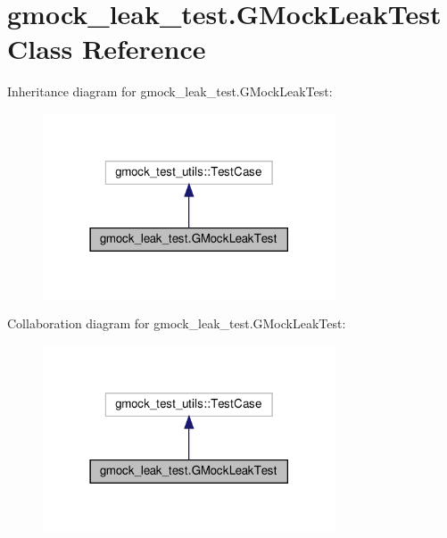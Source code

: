 \hypertarget{classgmock__leak__test_1_1_g_mock_leak_test}{}\section{gmock\+\_\+leak\+\_\+test.\+G\+Mock\+Leak\+Test Class Reference}
\label{classgmock__leak__test_1_1_g_mock_leak_test}


Inheritance diagram for gmock\+\_\+leak\+\_\+test.\+G\+Mock\+Leak\+Test\+:
\nopagebreak
\begin{figure}[H]
\begin{center}
\leavevmode
\includegraphics[width=246pt]{classgmock__leak__test_1_1_g_mock_leak_test__inherit__graph}
\end{center}
\end{figure}


Collaboration diagram for gmock\+\_\+leak\+\_\+test.\+G\+Mock\+Leak\+Test\+:
\nopagebreak
\begin{figure}[H]
\begin{center}
\leavevmode
\includegraphics[width=246pt]{classgmock__leak__test_1_1_g_mock_leak_test__coll__graph}
\end{center}
\end{figure}

